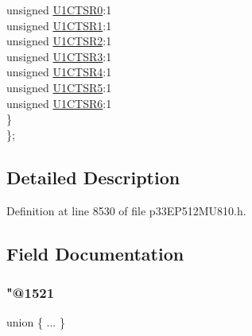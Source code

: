 \begin{DoxyCompactItemize}
\begin{tabbing}
\>\>unsigned \hyperlink{structtag_r_p_i_n_r18_b_i_t_s_a6015f790f707369b36cb383abc88786f}{U1CTSR0}:1\\
\>\>unsigned \hyperlink{structtag_r_p_i_n_r18_b_i_t_s_a5ef0d34d998db6e2e1ba19591d8e4fc2}{U1CTSR1}:1\\
\>\>unsigned \hyperlink{structtag_r_p_i_n_r18_b_i_t_s_ac5cfe6fd195e6369f6fa7e0947f2b01b}{U1CTSR2}:1\\
\>\>unsigned \hyperlink{structtag_r_p_i_n_r18_b_i_t_s_a7fadc8ecf30e0bc183e94e0e93b11e5a}{U1CTSR3}:1\\
\>\>unsigned \hyperlink{structtag_r_p_i_n_r18_b_i_t_s_a498d8853f6e4bd424720b5d2a3f03f59}{U1CTSR4}:1\\
\>\>unsigned \hyperlink{structtag_r_p_i_n_r18_b_i_t_s_a5ae07713f85a0bb9578faf3ae0ff2811}{U1CTSR5}:1\\
\>\>unsigned \hyperlink{structtag_r_p_i_n_r18_b_i_t_s_acf60c8bf07aaacf5e2b4c71f80c21b26}{U1CTSR6}:1\\
\>\} \\
\}; \\

\end{tabbing}\end{DoxyCompactItemize}


\subsection{Detailed Description}


Definition at line 8530 of file p33\+E\+P512\+M\+U810.\+h.



\subsection{Field Documentation}
\mbox{\label{structtag_r_p_i_n_r18_b_i_t_s_a2fdc9c160b5572523bf5783630705597}} 
\subsubsection{\texorpdfstring{"@1521}{@1521}}
{\footnotesize\ttfamily union \{ ... \} }

\mbox{\label{structtag_r_p_i_n_r18_b_i_t_s_adf71f3d8410c1f1dbbc96680a92c49af}} 
